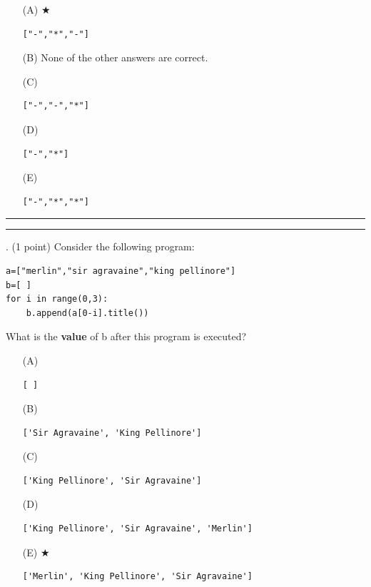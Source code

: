 \documentclass{article}
\begin{document}
\begin{enumerate}
\item[(A)] $\bigstar$ 
\begin{verbatim}["-","*","-"]\end{verbatim}

\item[(B)]
None of the other answers are correct.

\item[(C)]
\begin{verbatim}["-","-","*"]\end{verbatim}

\item[(D)]
\begin{verbatim}["-","*"]\end{verbatim}

\item[(E)]
\begin{verbatim}["-","*","*"]\end{verbatim}

\end{enumerate}

\vspace*{2em}
\hrule
\vspace{2em}

\vspace{2em}
\hrule height 2pt


\newpage
{}. (1 point)
Consider the following program:
\begin{verbatim}
a=["merlin","sir agravaine","king pellinore"]
b=[ ]
for i in range(0,3):
    b.append(a[0-i].title())
\end{verbatim}
What is the \textbf{value} of b after this program is executed?


\begin{enumerate}
\item[(A)]
\begin{verbatim}[ ]\end{verbatim}

\item[(B)]
\begin{verbatim}['Sir Agravaine', 'King Pellinore']\end{verbatim}

\item[(C)]
\begin{verbatim}['King Pellinore', 'Sir Agravaine']\end{verbatim}

\item[(D)]
\begin{verbatim}['King Pellinore', 'Sir Agravaine', 'Merlin']\end{verbatim}

\item[(E)] $\bigstar$ 
\begin{verbatim}['Merlin', 'King Pellinore', 'Sir Agravaine']\end{verbatim}

\end{enumerate}
\end{document}
